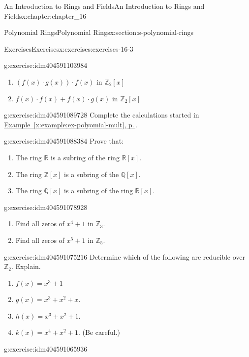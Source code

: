 \documentclass[twoside,10pt,]{book}
\newcommand{\xreffont}{\relax}
\numberwithin{equation}{section}
\begin{document}
\begin{chapterptx}{An Introduction to Rings and Fields}{}{An Introduction to Rings and Fields}{}{}{x:chapter:chapter_16}
\begin{sectionptx}{Polynomial Rings}{}{Polynomial Rings}{}{}{x:section:s-polynomial-rings}
\begin{exercises-subsection}{Exercises}{}{Exercises}{}{}{x:exercises:exercises-16-3}
\begin{divisionexercise}{1}{}{}{g:exercise:idm404591103984}
\begin{enumerate}[label=(\alph*)]
\item{}\((f(x) \cdot g(x)) \cdot f(x)\) in \(\mathbb{Z}_2[x]\)%
\item{}\(f(x) \cdot  f(x) + f(x)\cdot  g(x)\) in \(\mathbb{Z}_2[x]\)%
\end{enumerate}
%
\end{divisionexercise}%
\begin{divisionexercise}{2}{}{}{g:exercise:idm404591089728}%
Complete the calculations started in \hyperref[x:example:ex-polyomial-mult]{Example~{\xreffont\ref{x:example:ex-polyomial-mult}}, p.\,\pageref{x:example:ex-polyomial-mult}}.%
\end{divisionexercise}%
\begin{divisionexercise}{3}{}{}{g:exercise:idm404591088384}%
Prove that:%
\begin{enumerate}[label=(\alph*)]
\item{}The ring \(\mathbb{R}\) is a subring of the ring \(\mathbb{R}[x]\).%
\item{}The ring \(\mathbb{Z}[x]\) is a subring of the \(\mathbb{Q}[x]\).%
\item{}The ring \(\mathbb{Q}[x]\) is a subring of the ring \(\mathbb{R}[x]\).%
\end{enumerate}
%
\end{divisionexercise}%
\begin{divisionexercise}{4}{}{}{g:exercise:idm404591078928}%
%
\begin{enumerate}[label=(\alph*)]
\item{}Find all zeros of \(x^4+ 1\) in \(\mathbb{Z}_3\).%
\item{}Find all zeros of \(x^5 + 1\) in \(\mathbb{Z}_5\).%
\end{enumerate}
%
\end{divisionexercise}%
\begin{divisionexercise}{5}{}{}{g:exercise:idm404591075216}%
Determine which of the following are reducible over \(\mathbb{Z}_2\). Explain.%
\begin{enumerate}[label=(\alph*)]
\item{}\(f(x) = x^3 + 1\)%
\item{}\(g(x) = x^3 + x^2 + x\).%
\item{}\(h(x) = x^3+ x^2 + 1\).%
\item{}\(k(x) = x^4 +x^2+ 1\). (Be careful.)%
\end{enumerate}
%
\end{divisionexercise}%
\begin{divisionexercise}{6}{}{}{g:exercise:idm404591065936}%

\end{divisionexercise}
\end{exercises-subsection}
\end{sectionptx}
\end{chapterptx}
\end{document}
